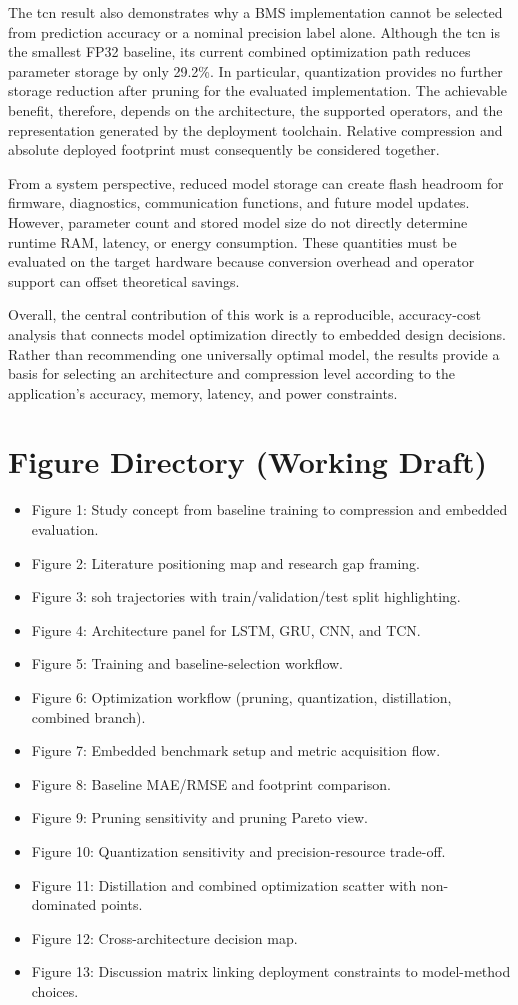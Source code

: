 \documentclass[final,3p,times]{elsarticle}
\begin{document}
The \ac{tcn} result also demonstrates why a BMS implementation cannot be selected from prediction accuracy or a nominal precision label alone. Although the \ac{tcn} is the smallest FP32 baseline, its current combined optimization path reduces parameter storage by only 29.2\%. In particular, quantization provides no further storage reduction after pruning for the evaluated implementation. The achievable benefit, therefore, depends on the architecture, the supported operators, and the representation generated by the deployment toolchain. Relative compression and absolute deployed footprint must consequently be considered together.

From a system perspective, reduced model storage can create flash headroom for firmware, diagnostics, communication functions, and future model updates. However, parameter count and stored model size do not directly determine runtime RAM, latency, or energy consumption. These quantities must be evaluated on the target hardware because conversion overhead and operator support can offset theoretical savings. 

Overall, the central contribution of this work is a reproducible, accuracy-cost analysis that connects model optimization directly to embedded design decisions. Rather than recommending one universally optimal model, the results provide a basis for selecting an architecture and
compression level according to the application's accuracy, memory, latency,
and power constraints.

\section*{Figure Directory (Working Draft)}
\begin{itemize}[leftmargin=*]
\item Figure 1: Study concept from baseline training to compression and embedded evaluation.
\item Figure 2: Literature positioning map and research gap framing.
\item Figure 3: \ac{soh} trajectories with train/validation/test split highlighting.
\item Figure 4: Architecture panel for LSTM, GRU, CNN, and TCN.
\item Figure 5: Training and baseline-selection workflow.
\item Figure 6: Optimization workflow (pruning, quantization, distillation, combined branch).
\item Figure 7: Embedded benchmark setup and metric acquisition flow.
\item Figure 8: Baseline MAE/RMSE and footprint comparison.
\item Figure 9: Pruning sensitivity and pruning Pareto view.
\item Figure 10: Quantization sensitivity and precision-resource trade-off.
\item Figure 11: Distillation and combined optimization scatter with non-dominated points.
\item Figure 12: Cross-architecture decision map.
\item Figure 13: Discussion matrix linking deployment constraints to model-method choices.
\end{itemize}
\end{document}
